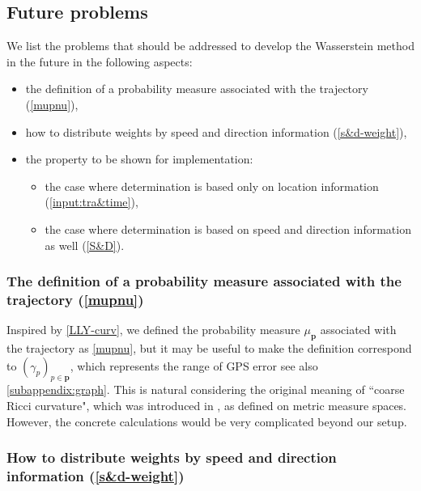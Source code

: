 \documentclass{article}
\numberwithin{equation}{section}
\theoremstyle{definition}
\begin{document}

\subsection{Future problems} \label{Wasserstein-FP}

We list the problems that should be addressed to develop the Wasserstein method in the future in the following aspects:
\begin{itemize}
    \item the definition of a probability measure associated with the trajectory (\autoref{mupnu}),
    \item how to distribute weights by speed and direction information (\autoref{s&d-weight}),
    \item the property to be shown for implementation:
    \begin{itemize}
        \item the case where determination is based only on location information (\autoref{input:tra&time}),
        \item the case where determination is based on speed and direction information as well (\autoref{S&D}).
    \end{itemize}
\end{itemize}

\subsubsection*{The definition of a probability measure associated with the trajectory (\autoref{mupnu})}

Inspired by \autoref{LLY-curv}, we defined the probability measure $\mu_\mathbf{p}$ associated with the trajectory as \autoref{mupnu}, but it may be useful to make the definition correspond to $(\gamma_p)_{p\in\mathbf{p}}$, which represents the range of GPS error see also \autoref{subappendix:graph}.
This is natural considering the original meaning of ``coarse Ricci curvature", which was introduced in \cite{Ol}, as defined on metric measure spaces.
However, the concrete calculations would be very complicated beyond our setup.

\subsubsection*{How to distribute weights by speed and direction information (\autoref{s&d-weight})}
\end{document}
